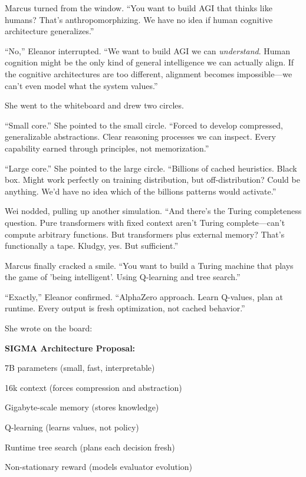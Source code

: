 Marcus turned from the window. ``You want to build AGI that thinks like humans? That's anthropomorphizing. We have no idea if human cognitive architecture generalizes.''

``No,'' Eleanor interrupted. ``We want to build AGI we can \emph{understand}. Human cognition might be the only kind of general intelligence we can actually align. If the cognitive architectures are too different, alignment becomes impossible---we can't even model what the system values.''

She went to the whiteboard and drew two circles.

``Small core.'' She pointed to the small circle. ``Forced to develop compressed, generalizable abstractions. Clear reasoning processes we can inspect. Every capability earned through principles, not memorization.''

``Large core.'' She pointed to the large circle. ``Billions of cached heuristics. Black box. Might work perfectly on training distribution, but off-distribution? Could be anything. We'd have no idea which of the billions patterns would activate.''

Wei nodded, pulling up another simulation. ``And there's the Turing completeness question. Pure transformers with fixed context aren't Turing complete---can't compute arbitrary functions. But transformers plus external memory? That's functionally a tape. Kludgy, yes. But sufficient.''

Marcus finally cracked a smile. ``You want to build a Turing machine that plays the game of 'being intelligent'. Using Q-learning and tree search.''

``Exactly,'' Eleanor confirmed. ``AlphaZero approach. Learn Q-values, plan at runtime. Every output is fresh optimization, not cached behavior.''

She wrote on the board:

\begin{center}
\textbf{SIGMA Architecture Proposal:}

7B parameters (small, fast, interpretable)

16k context (forces compression and abstraction)

Gigabyte-scale memory (stores knowledge)

Q-learning (learns values, not policy)

Runtime tree search (plans each decision fresh)

Non-stationary reward (models evaluator evolution)
\end{center}

